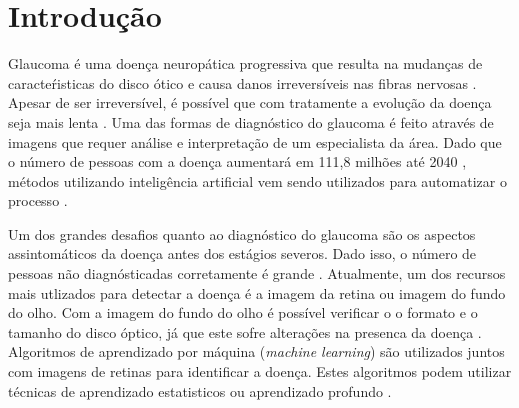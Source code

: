 \documentclass[ %
	msc, %
	portugues %
]{../ppgccufmg}
\begin{document}

	\chapter{Introdução}\label{intro}
        Glaucoma é uma doença neuropática progressiva que resulta na mudanças de caracteŕisticas do
        disco ótico e causa danos irreversíveis nas fibras nervosas \citep{felipemedeiros2014}. Apesar de ser irreversível, é
        possível que com tratamente a evolução da doença seja mais lenta
        \citep{GARWAYHEATH201368}. Uma das formas de
        diagnóstico do glaucoma é feito através de imagens que requer análise e interpretação de um especialista da
        área. Dado que o número de pessoas com a doença aumentará em 111,8 milhões até 2040
        \citep{Ottaiano2019}, métodos utilizando inteligência artificial vem sendo utilizados para
        automatizar o processo \citep{Barros2020}.


        Um dos grandes desafios quanto ao diagnóstico do glaucoma são os aspectos assintomáticos da
        doença antes dos estágios severos. Dado isso, o número de pessoas não diagnósticadas
            corretamente é grande \citep{burgoyne}. Atualmente,
            um dos recursos mais utlizados para detectar a doença é a imagem da retina ou imagem do
            fundo do olho. Com a imagem do fundo do olho é possível verificar o
            o formato e o tamanho do disco óptico, já que este sofre alterações na presenca da
            doença \citep{zangali}. Algoritmos de aprendizado por máquina
        (\textit{machine learning}) são utilizados juntos com imagens de retinas para identificar a
        doença. Estes algoritmos podem utilizar técnicas de aprendizado estatisticos ou aprendizado
        profundo \citep{Barros2020}.
\end{document}
